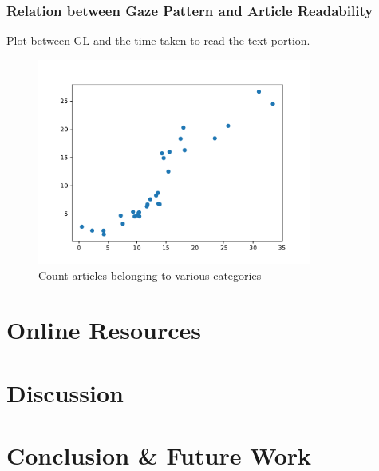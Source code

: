 \documentclass[12pt]{article}
\begin{document}
%



\subsubsection{Relation between Gaze Pattern and Article Readability}

Plot between GL and the time taken to read the text portion.

\begin{figure}[!htb]
    \center \includegraphics[width= 9cm]{images/GL_time.pdf}
    \caption{\label{fig: GL and time plot} Count articles belonging to various categories}
\end{figure}


    
\section{Online Resources}\label{sec:Resources}


\section{Discussion}\label{sec:Discussion}


\section{Conclusion \& Future Work}\label{sec:Conclusion}
\end{document}
